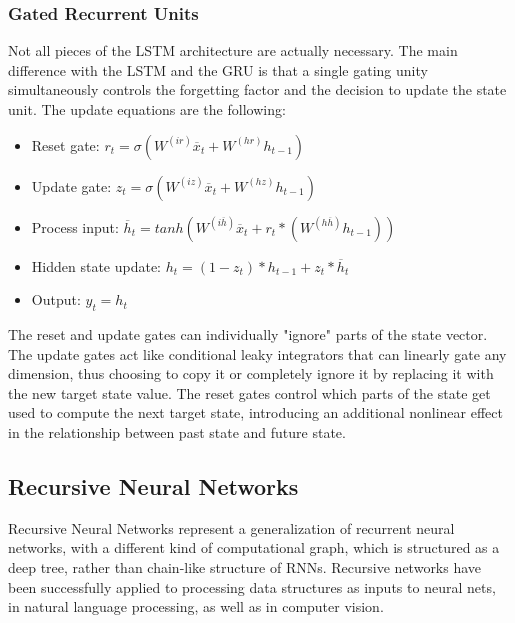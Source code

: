 \documentclass[12pt]{article}
\begin{document}
        \subsubsection{Gated Recurrent Units} \label{sec:GRU}
            Not all pieces of the LSTM architecture are actually necessary. The main difference with the LSTM and the
            GRU is that a single gating unity simultaneously controls the forgetting factor and the decision to update
            the state unit. The update equations are the following:

            \begin{itemize}
                \item Reset gate: $r_t = \sigma(W^{(ir)} \overline{x}_t + W^{(hr)}h_{t-1})$
                \item Update gate: $z_t = \sigma(W^{(iz)} \overline{x}_t + W^{(hz)}h_{t-1})$
                \item Process input: $\overline{h}_t = tanh(W^{(i\overline{h})} \overline{x}_t + r_t * (W^{(h\overline{h})}h_{t-1}))$
                \item Hidden state update: $h_t = (1-z_t)*h_{t-1} + z_t * \overline{h}_t$
                \item Output: $y_t = h_t$
            \end{itemize}

            The reset and update gates can individually "ignore" parts of the state vector. The update gates act like
            conditional leaky integrators that can linearly gate any dimension, thus choosing to copy it or completely
            ignore it by replacing it with the new target state value. The reset gates control which parts of the state
            get used to compute the next target state, introducing an additional nonlinear effect in the relationship
            between past state and future state.

    \subsection{Recursive Neural Networks}
        Recursive Neural Networks represent a generalization of recurrent neural networks, with a different kind of
        computational graph, which is structured as a deep tree, rather than chain-like structure of RNNs. Recursive
        networks have been successfully applied to processing data structures as inputs to neural nets, in natural
        language processing, as well as in computer vision. 
\end{document}
